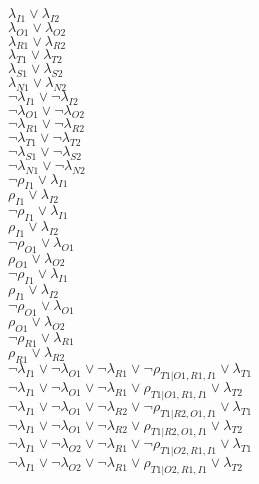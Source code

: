 $\lambda_{I1} \vee \lambda_{I2}$\\
$\lambda_{O1} \vee \lambda_{O2}$\\
$\lambda_{R1} \vee \lambda_{R2}$\\
$\lambda_{T1} \vee \lambda_{T2}$\\
$\lambda_{S1} \vee \lambda_{S2}$\\
$\lambda_{N1} \vee \lambda_{N2}$\\
$\neg\lambda_{I1} \vee \neg\lambda_{I2}$\\
$\neg\lambda_{O1} \vee \neg\lambda_{O2}$\\
$\neg\lambda_{R1} \vee \neg\lambda_{R2}$\\
$\neg\lambda_{T1} \vee \neg\lambda_{T2}$\\
$\neg\lambda_{S1} \vee \neg\lambda_{S2}$\\
$\neg\lambda_{N1} \vee \neg\lambda_{N2}$\\
$\neg\rho_{I1} \vee \lambda_{I1}$\\
$\rho_{I1} \vee \lambda_{I2}$\\
$\neg\rho_{I1} \vee \lambda_{I1}$\\
$\rho_{I1} \vee \lambda_{I2}$\\
$\neg\rho_{O1} \vee \lambda_{O1}$\\
$\rho_{O1} \vee \lambda_{O2}$\\
$\neg\rho_{I1} \vee \lambda_{I1}$\\
$\rho_{I1} \vee \lambda_{I2}$\\
$\neg\rho_{O1} \vee \lambda_{O1}$\\
$\rho_{O1} \vee \lambda_{O2}$\\
$\neg\rho_{R1} \vee \lambda_{R1}$\\
$\rho_{R1} \vee \lambda_{R2}$\\
$\neg\lambda_{I1} \vee \neg\lambda_{O1} \vee \neg\lambda_{R1} \vee \neg\rho_{T1|O1,R1,I1} \vee \lambda_{T1}$\\
$\neg\lambda_{I1} \vee \neg\lambda_{O1} \vee \neg\lambda_{R1} \vee \rho_{T1|O1,R1,I1} \vee \lambda_{T2}$\\
$\neg\lambda_{I1} \vee \neg\lambda_{O1} \vee \neg\lambda_{R2} \vee \neg\rho_{T1|R2,O1,I1} \vee \lambda_{T1}$\\
$\neg\lambda_{I1} \vee \neg\lambda_{O1} \vee \neg\lambda_{R2} \vee \rho_{T1|R2,O1,I1} \vee \lambda_{T2}$\\
$\neg\lambda_{I1} \vee \neg\lambda_{O2} \vee \neg\lambda_{R1} \vee \neg\rho_{T1|O2,R1,I1} \vee \lambda_{T1}$\\
$\neg\lambda_{I1} \vee \neg\lambda_{O2} \vee \neg\lambda_{R1} \vee \rho_{T1|O2,R1,I1} \vee \lambda_{T2}$\\
